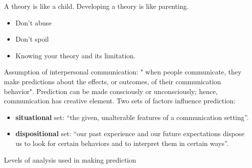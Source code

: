 \documentclass[
]{book}
\providecommand{\tightlist}{%
  \setlength{\itemsep}{0pt}\setlength{\parskip}{0pt}}
\begin{document}
A theory is like a child. Developing a theory is like parenting.

\begin{itemize}
\tightlist
\item
  Don't abuse
\item
  Don't spoil
\item
  Knowing your theory and its limitation.
\end{itemize}

\citep[pp.~5-30]{miller1995} Assumption of interpersonal communication: " when people communicate, they make predictions about the effects, or outcomes, of their communication behavior". Prediction can be made consciously or unconsciously; hence, communication has creative element. Two sets of factors influence prediction:

\begin{itemize}
\tightlist
\item
  \textbf{situational} set: ``the given, unalterable features of a communication setting''.\\
\item
  \textbf{dispositional} set: ``our past experience and our future expectations dispose us to look for certain behaviors and to interpret them in certain ways''.
\end{itemize}

Levels of analysis used in making prediction
\end{document}
